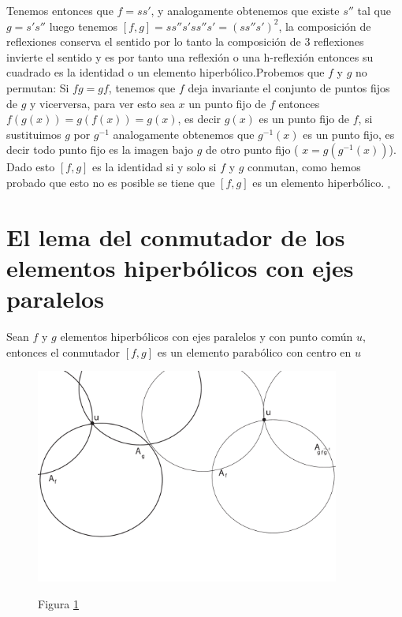 Tenemos entonces que $ f=ss' $, y analogamente obtenemos  que existe
$s''$ tal que $g=s's''$ luego tenemos
$[f,g]=ss''s'ss''s'=(ss''s')^{2}$, la composici\'on de reflexiones
conserva el sentido por lo tanto la composici\'on de 3 reflexiones
invierte el sentido y es por tanto una reflexi\'on o una
h-reflexi\'on entonces su cuadrado es la identidad o un elemento
hiperb\'olico.Probemos que  $f$ y $g$ no permutan: Si $fg=gf$, tenemos que $f$ deja invariante el conjunto de puntos fijos de $g$ y vicerversa, para ver esto sea $x$ un punto fijo de $f$ entonces $f(g(x))= g(f(x)) = g(x)$, es decir $g(x)$ es un punto fijo de $f$, si sustituimos $g$ por $g^{-1}$ analogamente obtenemos que $g^{-1}(x)$ es un punto fijo, es decir todo punto fijo es la imagen bajo $g$ de otro punto fijo ( $x= g(g^{-1}(x))$). Dado esto $[f,g]$ es la identidad si y solo si $f$ y $g$ conmutan, como hemos probado que esto no es posible se tiene que $[f,g]$ es un elemento hiperb\'olico. $_{\square}$

\section{El lema del conmutador de los elementos hiperb\'olicos con ejes paralelos}

\begin{lem} \label{lema4}
Sean $f$ y $g$ elementos hiperb\'olicos con ejes paralelos y con
punto com\'un $u$, entonces el conmutador $[f,g]$ es un elemento
parab\'olico con centro en $u$
\end{lem}

\begin{figure}[h]
  \centering
  \includegraphics[width=10cm]{lemma4-dibujo1}\\
  \caption{Figura \ref{lemma4-dibujo1}}\label{lemma4-dibujo1}
\end{figure}



